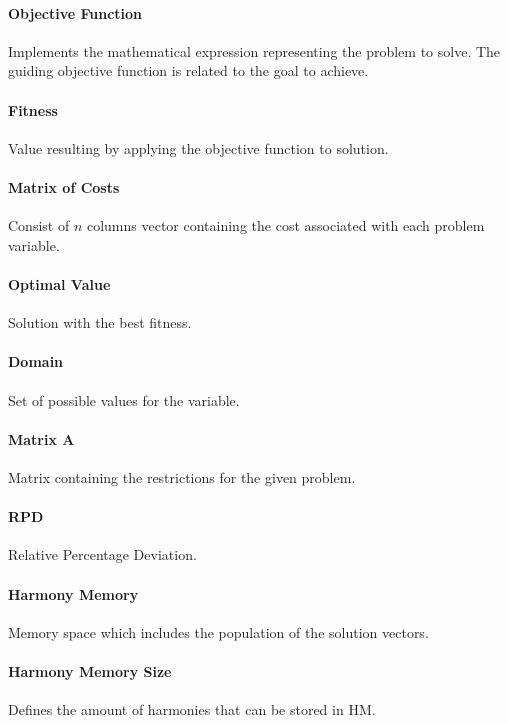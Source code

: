 \paragraph{Objective Function}  
Implements the mathematical expression representing the problem to solve. The guiding objective function is related to the goal to achieve.

\paragraph{Fitness} 
Value resulting by applying the objective function to solution.

\paragraph{Matrix of Costs} 
Consist of $n$ columns vector containing the cost associated with each problem variable.

\paragraph{Optimal Value} 
Solution with the best fitness.

\paragraph{Domain} 
Set of possible values for the variable.

\paragraph{Matrix A} 
Matrix containing the restrictions for the given problem.

\paragraph{RPD} 
Relative Percentage Deviation.

\paragraph{Harmony Memory} 
Memory space which includes the population of the solution vectors.

\paragraph{Harmony Memory Size} 
Defines the amount of harmonies that can be stored in HM.

